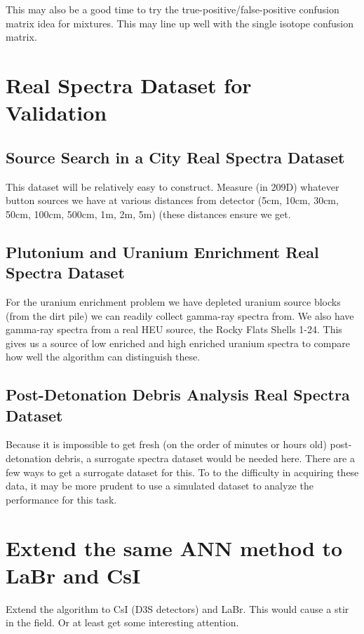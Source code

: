 \documentclass[thesis,tocnosub,noragright,centerchapter,12pt,fullpage]{uiucecethesis09}
\begin{document}
This may also be a good time to try the true-positive/false-positive confusion matrix idea for mixtures. This may line up well with the single isotope confusion matrix.



\section{Real Spectra Dataset for Validation}

\subsection{Source Search in a City Real Spectra Dataset}

This dataset will be relatively easy to construct. Measure (in 209D) whatever button sources we have at various distances from detector (5cm, 10cm, 30cm, 50cm, 100cm, 500cm, 1m, 2m, 5m) (these distances ensure we get.

\subsection{Plutonium and Uranium Enrichment Real Spectra Dataset}

For the uranium enrichment problem we have depleted uranium source blocks (from the dirt pile) we can readily collect gamma-ray spectra from. We also have gamma-ray spectra from a real HEU source, the Rocky Flats Shells 1-24. This gives us a source of low enriched and high enriched uranium spectra to compare how well the algorithm can distinguish these.  

\subsection{Post-Detonation Debris Analysis Real Spectra Dataset}

Because it is impossible to get fresh (on the order of minutes or hours old) post-detonation debris, a surrogate spectra dataset would be needed here. There are a few ways to get a surrogate dataset for this. To to the difficulty in acquiring these data, it may be more prudent to use a simulated dataset to analyze the performance for this task.


\section{Extend the same ANN method to LaBr and CsI}
   
Extend the algorithm to CsI (D3S detectors) and LaBr. This would cause a stir in the field. Or at least get some interesting attention. 
\end{document}
